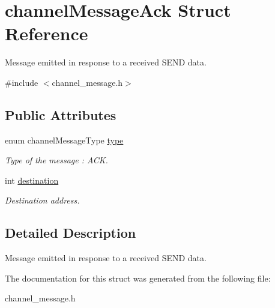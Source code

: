 \hypertarget{structchannelMessageAck}{\section{channel\-Message\-Ack Struct Reference}
\label{structchannelMessageAck}
}


Message emitted in response to a received S\-E\-N\-D data.  




{\ttfamily \#include $<$channel\-\_\-message.\-h$>$}

\subsection*{Public Attributes}
\begin{DoxyCompactItemize}
\item 
\hypertarget{structchannelMessageAck_a2e7a55ee3537df3d38e9171016dac405}{enum channel\-Message\-Type \hyperlink{structchannelMessageAck_a2e7a55ee3537df3d38e9171016dac405}{type}}\label{structchannelMessageAck_a2e7a55ee3537df3d38e9171016dac405}

\begin{DoxyCompactList}\small\item\em Type of the message \-: A\-C\-K. \end{DoxyCompactList}\item 
\hypertarget{structchannelMessageAck_ad4fb24231f2303d827700c3e157fd6b8}{int \hyperlink{structchannelMessageAck_ad4fb24231f2303d827700c3e157fd6b8}{destination}}\label{structchannelMessageAck_ad4fb24231f2303d827700c3e157fd6b8}

\begin{DoxyCompactList}\small\item\em Destination address. \end{DoxyCompactList}\end{DoxyCompactItemize}


\subsection{Detailed Description}
Message emitted in response to a received S\-E\-N\-D data. 

The documentation for this struct was generated from the following file\-:\begin{DoxyCompactItemize}
\item 
channel\-\_\-message.\-h\end{DoxyCompactItemize}
